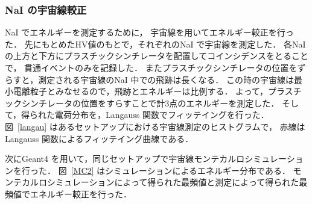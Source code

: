 \newpage

\subsubsection{NaI の宇宙線較正}
NaI でエネルギーを測定するために， 宇宙線を用いてエネルギー較正を行った．
先にもとめたHV値のもとで，それぞれのNaI で宇宙線を測定した．
各NaI の上方と下方にプラスチックシンチレータを配置してコインシデンスをとることで，
貫通イベントのみを記録した．
またプラスチックシンチレータの位置をずらすと，測定される宇宙線のNaI 中での飛跡は長くなる．
この時の宇宙線は最小電離粒子とみなせるので，飛跡とエネルギーは比例する．
よって，プラスチックシンチレータの位置をすらすことで計3点のエネルギーを測定した．
そして，得られた電荷分布を，Langauss 関数でフィッテイングを行った．
図~\ref{langau} はあるセットアップにおける宇宙線測定のヒストグラムで，
赤線はLangauss 関数によるフィッテイング曲線である．

次にGeant4 を用いて，同じセットアップで宇宙線モンテカルロシミュレーションを行った．
図~\ref{MC2} はシミュレーションによるエネルギー分布である．
モンテカルロシミュレーションによって得られた最頻値と測定によって得られた最頻値でエネルギー較正を行った．

